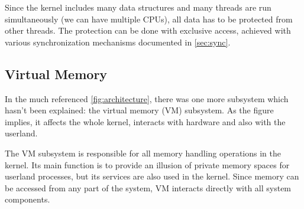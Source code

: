 \documentclass[twoside,a4paper]{report}
\begin{document}
Since the kernel includes many data structures and many threads are
run simultaneously (we can have multiple CPUs), all data has to be
protected from other threads. The protection can be done with
exclusive access, achieved with various synchronization mechanisms
documented in \autoref{sec:sync}.

\subsection{Virtual Memory}

In the much referenced \autoref{fig:architecture}, there was one
more subsystem which hasn't been explained: the virtual memory (VM)
subsystem. As the figure implies, it affects the whole kernel,
interacts with hardware and also with the userland.

The VM subsystem is responsible for all memory handling operations in
the kernel. Its main function is to provide an illusion of private
memory spaces for userland processes, but its services are also used
in the kernel. Since memory can be accessed from any part of the
system, VM interacts directly with all system components.
\end{document}
